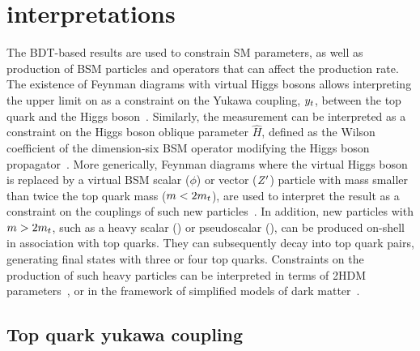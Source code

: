 \section{\smft interpretations}
\label{sec:ftinterpretations}

The BDT-based results are used to constrain SM parameters, as well as production of
BSM particles and operators that can affect the \tttt production rate. The
existence of \tttt Feynman diagrams with virtual Higgs bosons allows
interpreting the upper limit on \xsectttt as a constraint on the Yukawa
coupling, $y_{t}$, between the top quark and the Higgs
boson~\cite{THEORY:TopYukawaTTTT, THEORY:TopYukawaTTTTnew}. Similarly, the
measurement can be interpreted as a constraint on the Higgs boson oblique
parameter $\hat{H}$, defined as the Wilson coefficient of the dimension-six
BSM operator modifying the Higgs boson propagator~\cite{THEORY:ObliqueHiggs2019}.
More generically, Feynman diagrams where the virtual Higgs boson is replaced
by a virtual BSM scalar ($\phi$) or vector ($Z^\prime$) particle with mass
smaller than twice the top quark mass ($m < 2m_t$), are used to interpret
the result as a constraint on the couplings of such new
particles~\cite{THEORY:Alvarez2016nrz}. In addition, new particles with $m >
2m_t$, such as a heavy scalar (\PH) or pseudoscalar (\PSA), can be
produced on-shell in association with top quarks. They can subsequently decay
into top quark pairs, generating final states with three or four top quarks.
Constraints on the production of such heavy particles can be interpreted in
terms of 2HDM parameters~\cite{THEORY:Dicus1994bm,THEORY:Craig2015jba,THEORY:Craig2016ygr},
or in the framework of simplified models of dark matter~\cite{THEORY:Boveia2016mrp,
THEORY:Albert2017onk}.

\subsection{Top quark yukawa coupling}

